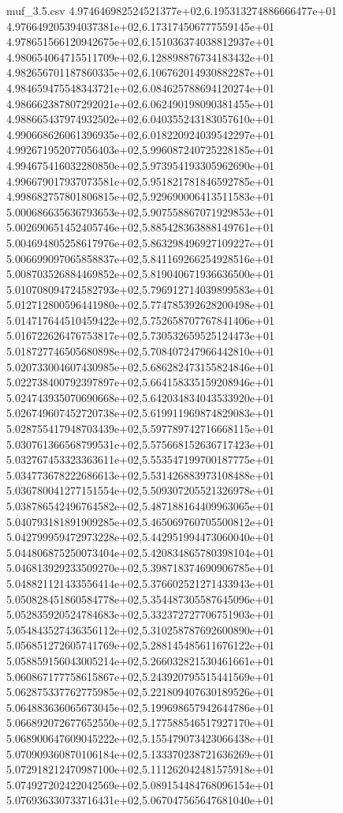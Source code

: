 \begin{filecontents*}{muf_3.5.csv}
4.974646982524521377e+02,6.195313274886666477e+01
4.976649205394037381e+02,6.173174506777559145e+01
4.978651566120942675e+02,6.151036374038812937e+01
4.980654064715511709e+02,6.128898876734183432e+01
4.982656701187860335e+02,6.106762014930882287e+01
4.984659475548343721e+02,6.084625788694120274e+01
4.986662387807292021e+02,6.062490198090381455e+01
4.988665437974932502e+02,6.040355243183057610e+01
4.990668626061396935e+02,6.018220924039542297e+01
4.992671952077056403e+02,5.996087240725228185e+01
4.994675416032280850e+02,5.973954193305962690e+01
4.996679017937073581e+02,5.951821781846592785e+01
4.998682757801806815e+02,5.929690006413511583e+01
5.000686635636793653e+02,5.907558867071929853e+01
5.002690651452405746e+02,5.885428363888149761e+01
5.004694805258617976e+02,5.863298496927109227e+01
5.006699097065858837e+02,5.841169266254928516e+01
5.008703526884469852e+02,5.819040671936636500e+01
5.010708094724582793e+02,5.796912714039899583e+01
5.012712800596441980e+02,5.774785392628200498e+01
5.014717644510459422e+02,5.752658707767841406e+01
5.016722626476753817e+02,5.730532659525124473e+01
5.018727746505680898e+02,5.708407247966442810e+01
5.020733004607430985e+02,5.686282473155824846e+01
5.022738400792397897e+02,5.664158335159208946e+01
5.024743935070690668e+02,5.642034834043533920e+01
5.026749607452720738e+02,5.619911969874829083e+01
5.028755417948703439e+02,5.597789742716668115e+01
5.030761366568799531e+02,5.575668152636717423e+01
5.032767453323363611e+02,5.553547199700187775e+01
5.034773678222686613e+02,5.531426883973108488e+01
5.036780041277151554e+02,5.509307205521326978e+01
5.038786542496764582e+02,5.487188164409963065e+01
5.040793181891909285e+02,5.465069760705500812e+01
5.042799959472973228e+02,5.442951994473060040e+01
5.044806875250073404e+02,5.420834865780398104e+01
5.046813929233509270e+02,5.398718374690906785e+01
5.048821121433556414e+02,5.376602521271433943e+01
5.050828451860584778e+02,5.354487305587645096e+01
5.052835920524784683e+02,5.332372727706751903e+01
5.054843527436356112e+02,5.310258787692600890e+01
5.056851272605741769e+02,5.288145485611676122e+01
5.058859156043005214e+02,5.266032821530461661e+01
5.060867177758615867e+02,5.243920795515441569e+01
5.062875337762775985e+02,5.221809407630189526e+01
5.064883636065673045e+02,5.199698657942644786e+01
5.066892072677652550e+02,5.177588546517927170e+01
5.068900647609045222e+02,5.155479073423066438e+01
5.070909360870106184e+02,5.133370238721636269e+01
5.072918212470987100e+02,5.111262042481575918e+01
5.074927202422042569e+02,5.089154484768096154e+01
5.076936330733716431e+02,5.067047565647681040e+01

\end{filecontents*}
